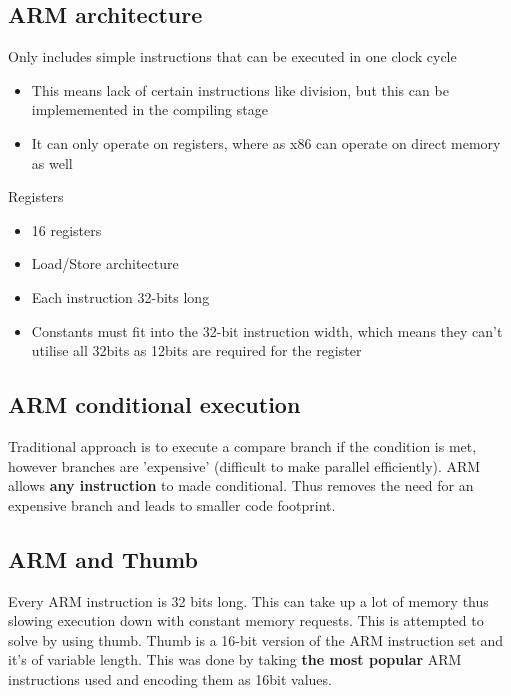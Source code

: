 \documentclass{article}
\begin{document}
\subsection{ARM architecture}

Only includes simple instructions that can be executed in one clock cycle
\begin{itemize}
  \item This means lack of certain instructions like division, but this can be implememented in the compiling stage
  \item It can only operate on registers, where as x86 can operate on direct memory as well
\end{itemize}
Registers
\begin{itemize}
  \item 16 registers
  \item Load/Store architecture
  \item Each instruction 32-bits long
  \item Constants must fit into the 32-bit instruction width, which means they can't utilise all 32bits as 12bits are required for the register
\end{itemize}

\subsection{ARM conditional execution}

\begin{flushleft}
Traditional approach is to execute a compare branch if the condition is met, however branches are 'expensive' (difficult to make parallel efficiently). ARM allows \textbf{any instruction} to made conditional. Thus removes the need for an expensive branch and leads to smaller code footprint.
\end{flushleft}

\subsection{ARM and Thumb}

\begin{flushleft}
Every ARM instruction is 32 bits long. This can take up a lot of memory thus slowing execution down with constant memory requests. This is attempted to solve by using thumb. Thumb is a 16-bit version of the ARM instruction set and it's of variable length. This was done by taking \textbf{the most popular} ARM instructions used and encoding them as 16bit values.
\end{flushleft}
\end{document}
